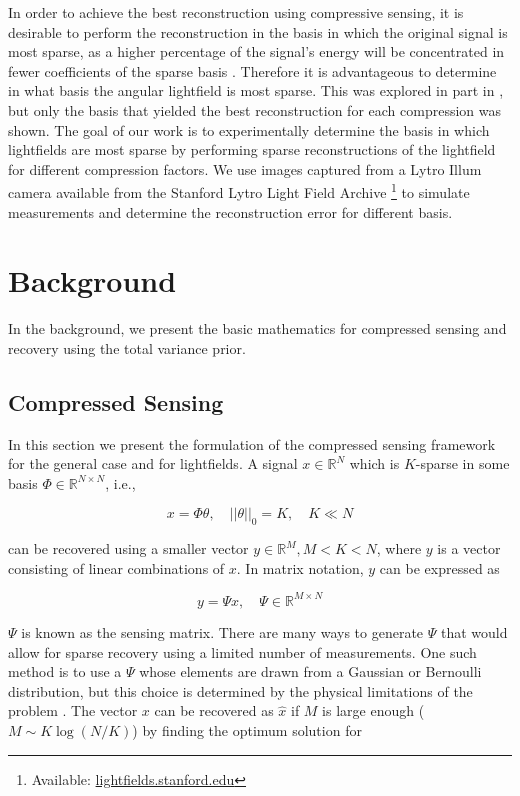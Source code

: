 \documentclass[10pt,twocolumn,letterpaper]{article}
\begin{document}
In order to achieve the best reconstruction using compressive sensing, it is desirable to perform the reconstruction in the basis in which the original signal is most sparse, as a higher percentage of the signal's energy will be concentrated in fewer coefficients of the sparse basis \cite{CompressiveSensingMega}. Therefore it is advantageous to determine in what basis the angular lightfield is most sparse. This was explored in part in \cite{mainP1}, but only the basis that yielded the best reconstruction for each compression was shown. The goal of our work is to experimentally determine the basis in which lightfields are most sparse by performing sparse reconstructions of the lightfield for different compression factors. We use images captured from a Lytro Illum camera available from the Stanford Lytro Light Field Archive \footnote{Available: \url{lightfields.stanford.edu}} to simulate measurements and determine the reconstruction error for different basis.

\section{Background}

In the background, we present the basic mathematics for compressed sensing and recovery using the total variance prior.

\subsection{Compressed Sensing}

In this section we present the formulation of the compressed sensing framework \cite{CSPaper} for the general case and for lightfields. A signal $x \in \mathbb{R}^N$ which is $K$-sparse in some basis $\Phi \in \mathbb{R}^{N\times N}$, i.e.,

\[ x = \Phi \theta, \quad ||\theta||_0 = K, \quad K \ll N\]

can be recovered using a smaller vector $y \in \mathbb{R}^M, M < K < N$, where $y$ is a vector consisting of linear combinations of $x$. In matrix notation, $y$ can be expressed as 

\[ y = \Psi x, \quad \Psi \in \mathbb{R}^{M \times N}\]

$\Psi$ is known as the sensing matrix. There are many ways to generate $\Psi$ that would allow for sparse recovery using a limited number of measurements. One such method is to use a $\Psi$ whose elements are drawn from a Gaussian or Bernoulli distribution, but this choice is determined by the physical limitations of the problem \cite{Rauhut11}. The vector $x$ can be recovered as $\hat{x}$ if $M$ is large enough ($M \sim K\log(N/K)$) by finding the optimum solution for 
\end{document}
